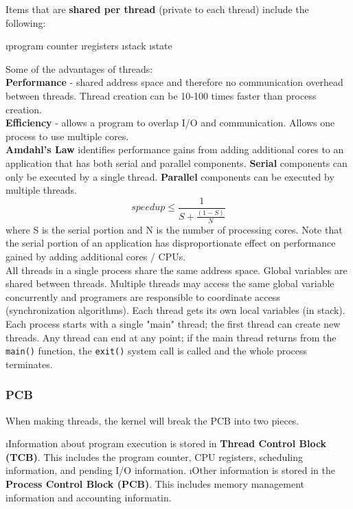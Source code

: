 \documentclass{article}
\begin{document}
    \noindent Items that are \textbf{shared per thread} (private to each thread) include the following:

    \bl
    \i program counter
    \i registers 
    \i stack
    \i state
    \el
    
    \noindent Some of the advantages of threads:  \\
    \textbf{Performance} - shared address space and therefore no communication overhead between threads. Thread creation can be 10-100 times faster than process creation. \\
    \textbf{Efficiency} - allows a program to overlap I/O and communication. Allows one process to use multiple cores. \\

    \noindent \textbf{Amdahl's Law} identifies performance gains from adding additional cores to an application that has both serial and parallel components. \textbf{Serial} components can only be executed by a single thread. \textbf{Parallel} components can be executed by multiple threads. 
    $$speedup \leq \frac{1}{S + \frac{(1-S)}{N}}$$
    where S is the serial portion and N is the number of processing cores. Note that the serial portion of an application has disproportionate effect on performance gained by adding additional cores / CPUs. \\

    All threads in a single process share the same address space. Global variables are shared between threads. Multiple threads may access the same global variable concurrently and programers are responsible to coordinate access (synchronization algorithms). Each thread gets its own local variables (in stack). Each process starts with a single "main" thread; the first thread can create new threads. Any thread can end at any point; if the main thread returns from the \texttt{main()} function, the \texttt{exit()} system call is called and the whole process terminates. \\
    
    \subsubsection{PCB}

    When making threads, the kernel will break the PCB into two pieces.

    \begin{enumerate}
    \i Information about program execution is stored in \textbf{Thread Control Block (TCB)}. This includes the program counter, CPU registers, scheduling information, and pending I/O information. 
    \i Other information is stored in the \textbf{Process Control Block (PCB)}. This includes memory management information and accounting informatin. 
    \end{enumerate}
\end{document}

